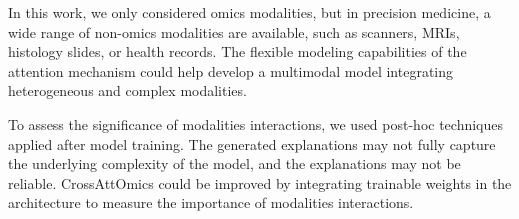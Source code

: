\documentclass[../main.tex]{subfiles}
\begin{document}
	In this work, we only considered omics modalities, but in precision medicine, a wide range of non-omics modalities are available, such as scanners, MRIs, histology slides, or health records.
	The flexible modeling capabilities of the attention mechanism could help develop a multimodal model integrating heterogeneous and complex modalities.

	To assess the significance of modalities interactions, we used post-hoc techniques applied after model training.
	The generated explanations may not fully capture the underlying complexity of the model, and the explanations may not be reliable.
	CrossAttOmics could be improved by integrating trainable weights in the architecture to measure the importance of modalities interactions.
\end{document}
